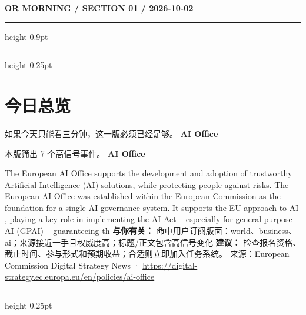 \documentclass[10.5pt]{ctexart}
\begin{document}
{\small\bfseries OR MORNING / SECTION 01 / 2026-10-02}
\vspace{2mm}
\hrule height 0.9pt
\vspace{1.5mm}
\hrule height 0.25pt
\vspace{4mm}
\section*{今日总览}
{\color{ormuted} 如果今天只能看三分钟，这一版必须已经足够。}
\vspace{2mm}
{\fontsize{25}{29}\selectfont\bfseries AI Office}\par
\vspace{2mm}
{\large 本版筛出 7 个高信号事件。}
\vspace{3mm}
{\Large\bfseries AI Office}\par
The European AI Office supports the development and adoption of trustworthy Artificial Intelligence (AI) solutions, while protecting people against risks. The European AI Office was established within the European Commission as the foundation for a single AI governance system. It supports the EU approach to AI , playing a key role in implementing the AI Act – especially for general-purpose AI (GPAI) – guaranteeing th
\textbf{与你有关：} 命中用户订阅版面：world、business、ai；来源接近一手且权威度高；标题/正文包含高信号变化
\textbf{建议：} 检查报名资格、截止时间、参与形式和预期收益；合适则立即加入任务系统。
{\footnotesize\color{ormuted} 来源：European Commission Digital Strategy News · \url{https://digital-strategy.ec.europa.eu/en/policies/ai-office}}
\vspace{3mm}
\hrule height 0.25pt
\vspace{3mm}
\end{document}
